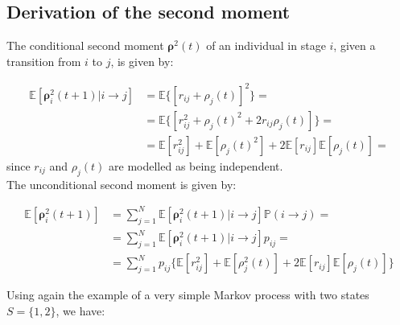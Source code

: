 \documentclass[\main/main.tex]{subfiles}
\begin{document}
\subsection{Derivation of the second moment}


\noindent The conditional second moment $\bm{\rho}^2(t)$ of an individual in stage $i$, given a transition from $i$ to $j$, is given by: 

\begin{equation}
\begin{split}
    \mathds{E} [\bm{\rho}_i^2 (t+1) | i \rightarrow j ] &= \mathds{E} \big\{ [ r_{ij} + \rho_j(t)]^2 \big\} =\\
    &= \mathds{E} \big\{ [ r_{ij}^2 + \rho_j(t)^2 + 2 r_{ij} \rho_j(t)] \big\} =\\
     &= \mathds{E} [ r_{ij}^2] +\mathds{E} [ \rho_j(t)^2] + 2 \mathds{E} [r_{ij}] \mathds{E} [\rho_j(t)]  =
\end{split}
\end{equation}
since $r_{ij}$ and $\rho_j(t)$ are modelled as being independent.\\

\noindent The unconditional second moment is given by: 

\begin{equation}
\begin{split}
\mathds{E} [\bm{\rho}_i^2 (t+1)] &= \sum_{j=1}^N \mathds{E} [\bm{\rho}_i^2 (t+1) | i \rightarrow j ] \mathds{P}(i\rightarrow j) =\\
&= \sum_{j=1}^N \mathds{E} [\bm{\rho}_i^2 (t+1) | i \rightarrow j ] p_{ij} =\\
&= \sum_{j=1}^N p_{ij} \{ \mathds{E} [ r_{ij}^2] +\mathds{E} [ \rho_j^2(t)] + 2 \mathds{E} [r_{ij}] \mathds{E} [\rho_j(t)]\}
\end{split}
\end{equation}

Using again the example of a very simple Markov process with two states $S=\{1,2\}$, we have:
\end{document}

